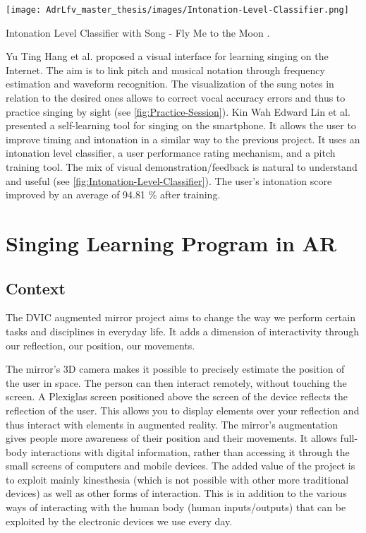 \begin{marginfigure}
    \centering
    \texttt{[image: AdrLfv\_master\_thesis/images/Intonation-Level-Classifier.png]}
    \caption{Intonation Level Classifier with Song - Fly Me to the Moon \cite{lin2014implementation}.}
    \label{fig:Intonation-Level-Classifier}
\end{marginfigure}

Yu Ting Hang et al. proposed a visual interface for learning singing on the Internet. The aim is to link pitch and musical notation through frequency estimation and waveform recognition. The visualization of the sung notes in relation to the desired ones allows to correct vocal accuracy errors and thus to practice singing by sight \cite{huang2016visualized} (see \ref{fig:Practice-Session}).
Kin Wah Edward Lin et al. presented a self-learning tool for singing on the smartphone. It allows the user to improve timing and intonation in a similar way to the previous project. It uses an intonation level classifier, a user performance rating mechanism, and a pitch training tool. The mix of visual demonstration/feedback is natural to understand and useful (see \ref{fig:Intonation-Level-Classifier}). The user’s intonation score improved by an average of 94.81 \% after training.

\section{Singing Learning Program in AR}

\subsection{Context}

The DVIC augmented mirror project aims to change the way we perform certain tasks and disciplines in everyday life.
It adds a dimension of interactivity through our reflection, our position, our movements.

The mirror’s 3D camera makes it possible to precisely estimate the position of the user in  space. The person can then interact remotely, without touching the screen. A Plexiglas screen positioned above the screen of the device reflects the reflection of the user. This allows you to display elements over your reflection and thus interact with elements in augmented reality. The mirror’s augmentation gives people more awareness of their position and their movements. It allows full-body interactions with digital information, rather than accessing it through the small screens of computers and mobile devices. The added value of the project is to exploit mainly kinesthesia (which is not possible with other more traditional devices) as well as other forms of interaction. This is in addition to the various ways of interacting with the human body (human inputs/outputs) that can be exploited by the electronic devices we use every day.

